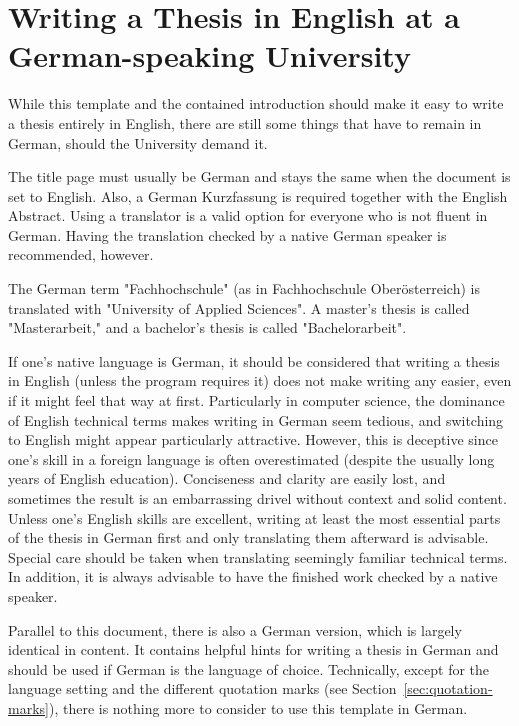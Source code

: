 \section{Writing a Thesis in English at a German-speaking University}
\label{sec:german}

While this template and the contained introduction should make it easy to write
a thesis entirely in English, there are still some things that have to remain in
German, should the University demand it.

The title page must usually be German and stays the same when the document is
set to English. Also, a German Kurzfassung is required together with the English
Abstract. Using a translator is a valid option for everyone who is not fluent
in German. Having the translation checked by a native German speaker is
recommended, however.

The German term "Fachhochschule" (as in Fachhochschule Oberösterreich) is
translated with "University of Applied Sciences". A master's thesis is called
"Masterarbeit," and a bachelor's thesis is called "Bachelorarbeit".

If one's native language is German, it should be considered that writing a
thesis in English (unless the program requires it) does not make writing any
easier, even if it might feel that way at first. Particularly in computer
science, the dominance of English technical terms makes writing in German seem
tedious, and switching to English might appear particularly attractive. However,
this is deceptive since one's skill in a foreign language is often overestimated
(despite the usually long years of English education). Conciseness and clarity
are easily lost, and sometimes the result is an embarrassing drivel without
context and solid content. Unless one's English skills are excellent, writing at
least the most essential parts of the thesis in German first and only
translating them afterward is advisable. Special care should be taken when
translating seemingly familiar technical terms. In addition, it is always
advisable to have the finished work checked by a native speaker.

Parallel to this document, there is also a German version, which is largely
identical in content. It contains helpful hints for writing a thesis in German
and should be used if German is the language of choice. Technically, except for
the language setting and the different quotation marks (see
Section~\ref{sec:quotation-marks}), there is nothing more to consider to use
this template in German.
